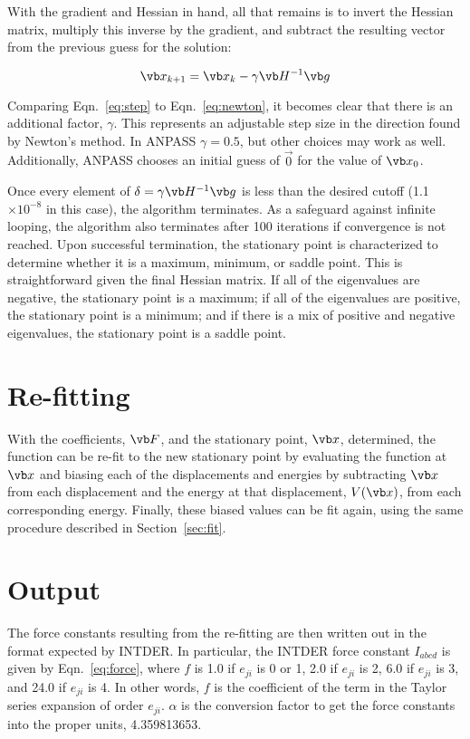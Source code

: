 \documentclass{article}
\begin{document}
With the gradient and Hessian in hand, all that remains is to invert the Hessian
matrix, multiply this inverse by the gradient, and subtract the resulting vector
from the previous guess for the solution:

\begin{equation}
  \label{eq:step}
  \vb x_{k+1} = \vb x_k - \gamma \vb H^{-1} \vb g
\end{equation}

Comparing Eqn.~\ref{eq:step} to Eqn.~\ref{eq:newton}, it becomes clear that
there is an additional factor, $\gamma$. This represents an adjustable step size
in the direction found by Newton's method. In ANPASS $\gamma = 0.5$, but other
choices may work as well. Additionally, ANPASS chooses an initial guess of
$\vec 0$ for the value of $\vb x_0$.

Once every element of $\delta = \gamma \vb H^{-1} \vb g$ is less than the
desired cutoff (1.1 $\times 10^{-8}$ in this case), the algorithm terminates. As
a safeguard against infinite looping, the algorithm also terminates after 100
iterations if convergence is not reached. Upon successful termination, the
stationary point is characterized to determine whether it is a maximum, minimum,
or saddle point. This is straightforward given the final Hessian matrix. If all
of the eigenvalues are negative, the stationary point is a maximum; if all of
the eigenvalues are positive, the stationary point is a minimum; and if there is
a mix of positive and negative eigenvalues, the stationary point is a saddle
point.

\section{Re-fitting}

With the coefficients, $\vb F$, and the stationary point, $\vb x$, determined,
the function can be re-fit to the new stationary point by evaluating the
function at $\vb x$ and biasing each of the displacements and energies by
subtracting $\vb x$ from each displacement and the energy at that displacement,
$V(\vb x)$, from each corresponding energy. Finally, these biased values can be
fit again, using the same procedure described in Section~\ref{sec:fit}.

\section{Output}
\label{sec:out}

The force constants resulting from the re-fitting are then written out in the
format expected by INTDER. In particular, the INTDER force constant $I_{abcd}$
is given by Eqn.~\ref{eq:force}, where $f$ is 1.0 if $e_{ji}$ is 0 or 1, 2.0 if
$e_{ji}$ is 2, 6.0 if $e_{ji}$ is 3, and 24.0 if $e_{ji}$ is 4. In other words,
$f$ is the coefficient of the term in the Taylor series expansion of order
$e_{ji}$. $\alpha$ is the conversion factor to get the force constants into the
proper units, 4.359813653.
\end{document}
